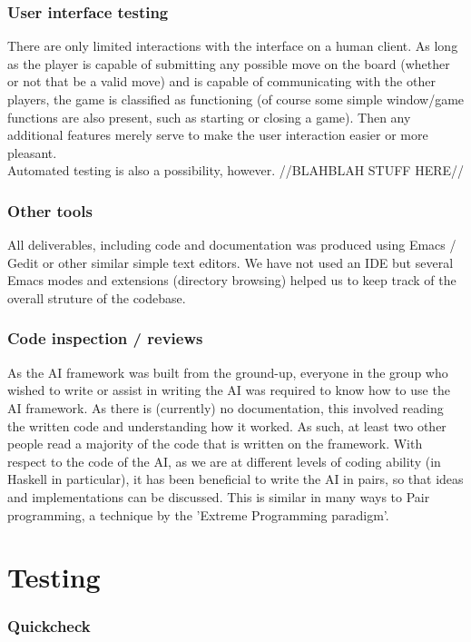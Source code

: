 \documentclass[11pt]{article}
\begin{document}
\subsubsection{User interface testing}
There are only limited interactions with the interface on a human client. As 
long as the player is capable of submitting any possible move on the board
(whether or not that be a valid move) and is capable of communicating with the
other players, the game is classified as functioning (of course some simple 
window/game functions are also present, such as starting or closing a game).
Then any additional features merely serve to make the user interaction easier 
or more pleasant.
\\
Automated testing is also a possibility, however. //BLAHBLAH STUFF HERE//

\subsubsection{Other tools}
All deliverables, including code and documentation was produced using Emacs /
Gedit or other similar simple text editors. We have not used an IDE but several
Emacs modes and extensions (directory browsing) helped us to keep track of the
overall struture of the codebase. 

\subsubsection{Code inspection / reviews}
As the AI framework was built from the ground-up, everyone in the group who
wished to write or assist in writing the AI was required to know how to use the
AI framework. As there is (currently) no documentation, this involved reading
the written code and understanding how it worked. As such, at least two other 
people read a majority of the code that is written on the framework. With 
respect to the code of the AI, as we are at different levels of coding ability 
(in Haskell in particular), it has been beneficial to write the AI in pairs, so
that ideas and implementations can be discussed. This is similar in many ways to
Pair programming, a technique by the 'Extreme Programming paradigm'.

\section{Testing}

\subsubsection{Quickcheck}
\end{document}
